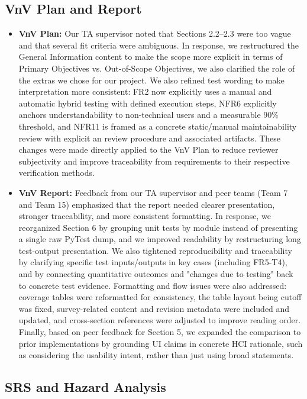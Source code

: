 \documentclass{article}
\begin{document}
\subsection{VnV Plan and Report}

\begin{itemize}
    \item \textbf{VnV Plan:} Our TA supervisor noted that Sections 2.2--2.3 were too vague and that several fit criteria were ambiguous. In response, we restructured the General Information content to make the scope more explicit in terms of Primary Objectives vs.
    Out-of-Scope Objectives, we also clarified the role of the extras we chose for our project. We also refined test wording to make interpretation more consistent: FR2 now explicitly uses a manual and automatic hybrid testing with defined execution steps, NFR6 explicitly anchors understandability to non-technical users and a measurable 90\% threshold, and NFR11 is framed as a concrete static/manual maintainability review with explicit an review procedure and associated artifacts. These changes were made directly applied to the VnV Plan to reduce reviewer subjectivity and improve traceability from requirements to their respective verification methods.
    \item \textbf{VnV Report:} Feedback from our TA supervisor and peer teams (Team 7 and Team 15) emphasized that the report needed clearer presentation, stronger traceability, and more consistent formatting. In response, we reorganized Section 6 by grouping unit tests by module instead of presenting a single raw PyTest dump, and we improved readability by restructuring long test-output presentation. We also tightened reproducibility and traceability by clarifying specific test inputs/outputs in key cases (including FR5-T4), and by connecting quantitative outcomes and "changes due to testing" back to concrete test evidence. Formatting and flow issues were also addressed: coverage tables were reformatted for consistency, the table layout being cutoff was fixed, survey-related content and revision metadata were included and updated, and cross-section references were adjusted to improve reading order. Finally, based on peer feedback for Section 5, we expanded the comparison to prior implementations by grounding UI claims in concrete HCI rationale, such as considering the usability intent, rather than just using broad statements.
    
\end{itemize}

\subsection{SRS and Hazard Analysis}
\end{document}
